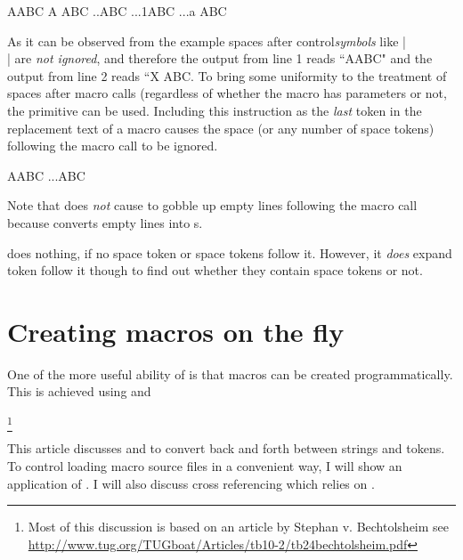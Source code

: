 \begin{codeexample}[]
\bgroup
\def\\{A}
\def\xx{..}
\def\yy{...}

\\ABC
\\ ABC
\xx ABC
\yy{1}ABC
\yy{a} ABC
\egroup
\end{codeexample}

As it can be observed from the example spaces after control\textit{symbols} like |\\| are \emph{not ignored}, and therefore the output from line 1 reads ``AABC" and the output from line 2 reads ``X ABC. To bring some uniformity to the treatment of spaces after macro calls (regardless of whether the macro has parameters or not, the \cmd{\ignorespaces} primitive can be used. Including this instruction as the \emph{last} token in the replacement text of a macro causes the space (or any number of space tokens) following the macro call to be ignored.

\bgroup
\def\\{A\ignorespaces}
\def\yy{...\ignorespaces}

\\ABC
\yy{a}\ignorespaces ABC
\egroup

Note that \cmd{\ignorespaces} does \emph{not} cause \tex to gobble up empty lines following the macro call because \tex converts empty lines into s. 

\cmd{\ignorespaces} does nothing, if no space token or space tokens follow it.  However, it \emph{does} expand token follow it though to find out whether they contain space tokens or not.

\section{Creating macros on the fly}


One of the more useful ability of \tex is that macros can be created programmatically. This is achieved using \cmd{\string} and \cmd{\csname}

\footnote{Most of this discussion is based on an article by Stephan v. Bechtolsheim see \url{http://www.tug.org/TUGboat/Articles/tb10-2/tb24bechtolsheim.pdf}}

This article discusses \cmd{\string} and \cmd{\csname} to
convert back and forth between strings and tokens.
To control loading macro source files in a convenient
way, I will show an application of \cmd{\csname}. I
will also discuss cross referencing which relies on
\cmd{\csname}.


